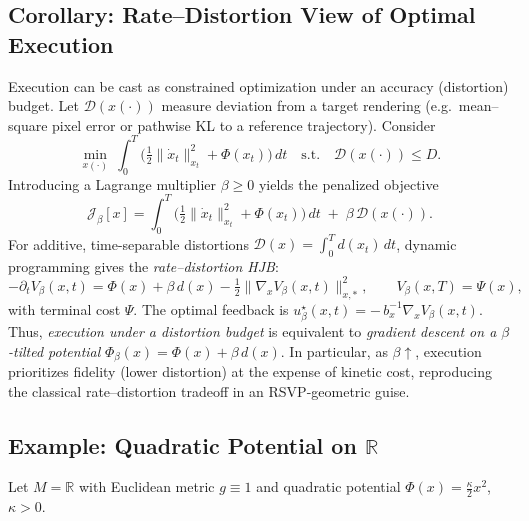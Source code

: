 \documentclass[12pt,a4paper]{article}
\theoremstyle{plain}
\theoremstyle{definition}
\theoremstyle{remark}
\newcommand{\Phifield}{\Phi}
\begin{document}
\subsection{Corollary: Rate--Distortion View of Optimal Execution}
\label{subsec:rate-distortion}

Execution can be cast as constrained optimization under an accuracy (distortion) budget. Let $\mathcal{D}(x(\cdot))$ measure deviation from a target rendering (e.g.\ mean–square pixel error or pathwise KL to a reference trajectory). Consider
\begin{equation}\label{eq:rd-primal}
\min_{x(\cdot)} \ \int_{0}^{T}\!\Big(\tfrac{1}{2}\|\dot x_t\|_{x_t}^{2}+\Phifield(x_t)\Big)\,dt \quad\text{s.t.}\quad \mathcal{D}(x(\cdot)) \le D.
\end{equation}
Introducing a Lagrange multiplier $\beta\!\ge\!0$ yields the penalized objective
\begin{equation}\label{eq:rd-lag}
\mathcal{J}_{\beta}[x] = \int_{0}^{T}\!\Big(\tfrac{1}{2}\|\dot x_t\|_{x_t}^{2}+\Phifield(x_t)\Big)\,dt \;+\; \beta\,\mathcal{D}(x(\cdot)).
\end{equation}
For additive, time-separable distortions $\mathcal{D}(x)=\int_{0}^{T} d(x_t)\,dt$, dynamic programming gives the \emph{rate--distortion HJB}:
\begin{equation}\label{eq:rd-hjb}
-\partial_t V_{\beta}(x,t) = \Phifield(x) + \beta\, d(x) - \tfrac{1}{2}\|\nabla_x V_{\beta}(x,t)\|_{x,*}^{2}, \qquad V_{\beta}(x,T)=\Psi(x),
\end{equation}
with terminal cost $\Psi$. The optimal feedback is $u^{\star}_{\beta}(x,t) = -\,b_x^{-1}\nabla_x V_{\beta}(x,t)$. Thus, \emph{execution under a distortion budget} is equivalent to \emph{gradient descent on a $\beta$-tilted potential} $\Phifield_{\beta}(x)=\Phifield(x)+\beta\,d(x)$. In particular, as $\beta\!\uparrow$, execution prioritizes fidelity (lower distortion) at the expense of kinetic cost, reproducing the classical rate--distortion tradeoff in an RSVP-geometric guise.

\subsection{Example: Quadratic Potential on $\mathbb{R}$}
\label{subsec:quadratic-example}

Let $M=\mathbb{R}$ with Euclidean metric $g\equiv 1$ and quadratic potential $\Phifield(x)=\frac{\kappa}{2}x^{2}$, $\kappa>0$.
\end{document}
